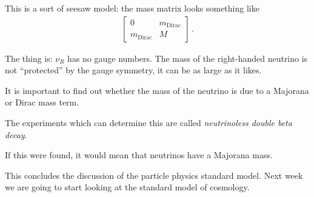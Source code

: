\documentclass[main.tex]{subfiles}
\begin{document}
This is a sort of seesaw model: the mass matrix looks something like 
%
\begin{subequations}
\begin{align}
\left[\begin{array}{cc}
0 & m _{\text{Dirac}} \\ 
m _{\text{Dirac}} & M
\end{array}\right]
\,.
\end{align}
\end{subequations}

The thing is: \(\nu_{R}\) has no gauge numbers. 
The mass of the right-handed neutrino is not ``protected'' by the gauge symmetry, it can be as large as it likes. 


It is important to find out whether the mass of the neutrino is due to a Majorana or Dirac mass term.

The experiments which can determine this are called \emph{neutrinoless double beta decay}.

If this were found, it would mean that neutrinos have a Majorana mass.

This concludes the discussion of the particle physics standard model. Next week we are going to start looking at the standard model of cosmology.
\end{document}
